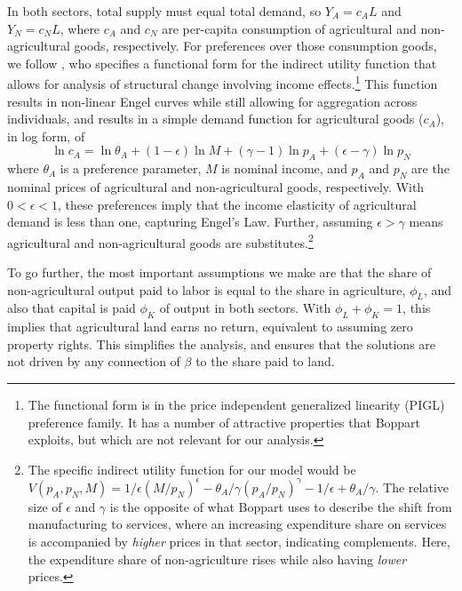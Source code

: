\documentclass[11pt]{article}
\begin{document}
In both sectors, total supply must equal total demand, so $Y_A = c_A L$ and $Y_N = c_N L$, where $c_A$ and $c_N$ are per-capita consumption of agricultural and non-agricultural goods, respectively. For preferences over those consumption goods, we follow \cite{boppart2014}, who specifies a functional form for the indirect utility function that allows for analysis of structural change involving income effects.\footnote{The functional form is in the price independent generalized linearity (PIGL) preference family. It has a number of attractive properties that Boppart exploits, but which are not relevant for our analysis.} This function results in non-linear Engel curves while still allowing for aggregation across individuals, and results in a simple demand function for agricultural goods ($c_A$), in log form, of
\begin{equation}
    \ln c_A = \ln \theta_A + (1-\epsilon) \ln M + (\gamma - 1) \ln p_A + (\epsilon - \gamma) \ln p_N \label{EQ_ca_demand}
\end{equation}
where $\theta_A$ is a preference parameter, $M$ is nominal income, and $p_A$ and $p_N$ are the nominal prices of agricultural and non-agricultural goods, respectively. With $0 < \epsilon < 1$, these preferences imply that the income elasticity of agricultural demand is less than one, capturing Engel's Law. Further, assuming $\epsilon > \gamma$ means agricultural and non-agricultural goods are substitutes.\footnote{The specific indirect utility function for our model would be $V(p_A,p_N,M) = 1/\epsilon \left(M/p_N\right)^{\epsilon} - \theta_A/\gamma \left(p_A/p_N\right)^{\gamma} - 1/\epsilon + \theta_A/\gamma$. The relative size of $\epsilon$ and $\gamma$ is the opposite of what Boppart uses to describe the shift from manufacturing to services, where an increasing expenditure share on services is accompanied by \textit{higher} prices in that sector, indicating complements. Here, the expenditure share of non-agriculture rises while also having \textit{lower} prices.}

To go further, the most important assumptions we make are that the share of non-agricultural output paid to labor is equal to the share in agriculture, $\phi_L$, and also that capital is paid $\phi_K$ of output in both sectors. With $\phi_L + \phi_K = 1$, this implies that agricultural land earns no return, equivalent to assuming zero property rights. This simplifies the analysis, and ensures that the solutions are not driven by any connection of $\beta$ to the share paid to land. 
\end{document}
